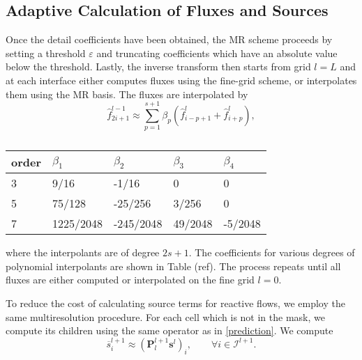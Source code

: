\documentclass[]{article}
\begin{document}
    \subsection*{Adaptive Calculation of Fluxes and Sources}

        Once the detail coefficients have been obtained, the MR scheme
        proceeds by setting a threshold $\varepsilon$ and truncating coefficients
        which have an absolute value below the threshold. Lastly, the inverse
        transform then starts from grid $l=L$ and at each interface either
        computes fluxes using the fine-grid scheme, or interpolates them using
        the MR basis. The fluxes are interpolated by
        \begin{equation}
            \hat{f}_{2i+1}^{l-1} \approx \sum_{p=1}^{s+1} \beta_{p} \left(
            \hat{f}^{l}_{i-p+1} + \hat{f}^{l}_{i+p} \right),
        \end{equation}
        \begin{table}[]
            \center
            \begin{tabular}{|l|l|l|l|l|}
            \hline
                order    & $\beta_{1}$ & $\beta_{2}$ & $\beta_{3}$ & $\beta_{4}$ \\ \hline
                3 & 9/16         & -1/16        & 0            & 0 \\ \hline
                5 & 75/128       & -25/256      & 3/256        & 0 \\ \hline
                7 & 1225/2048    & -245/2048    & 49/2048      & -5/2048 \\ \hline
            \end{tabular}
            \label{coeff2}
            \caption{}
        \end{table}
        where the interpolants are of degree $2s+1$. The coefficients for
        various degrees of polynomial interpolants are shown in Table (ref).
        The process repeats until all fluxes are either computed or
        interpolated on the fine grid $l=0$.

        To reduce the cost of calculating source terms for reactive flows, we employ
        the same multiresolution procedure. For each cell which is not in the mask,
        we compute its children using the same operator as in \ref{prediction}.
        We compute
        \begin{equation}
            \overline{s}_{i}^{l+1} \approx \left( \bm{P}_{l}^{l+1} \bm{s}^{l}
                \right)_{i}, \text{ } \text{ } \text{ } \forall i \in
                \bm{\mathcal{I}}^{l+1}.
        \end{equation}
\end{document}

